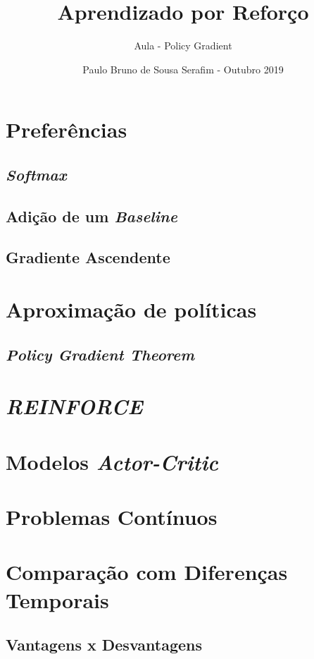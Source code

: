 \documentclass{article}
\title{Aprendizado por Reforço}
\author{Aula  - Policy Gradient}
\date{Paulo Bruno de Sousa Serafim - Outubro 2019}
\begin{document}
\maketitle

\section{Preferências}

    \subsection{\emph{Softmax}}
        
    \subsection{Adição de um \emph{Baseline}}
    
    \subsection{Gradiente Ascendente}
    
\section{Aproximação de políticas}

    \subsection{\emph{Policy Gradient Theorem}}
    
\section{\emph{REINFORCE}}

\section{Modelos \emph{Actor-Critic}}

\section{Problemas Contínuos}

\section{Comparação com Diferenças Temporais}

    \subsection{Vantagens x Desvantagens}
    
\end{document}
